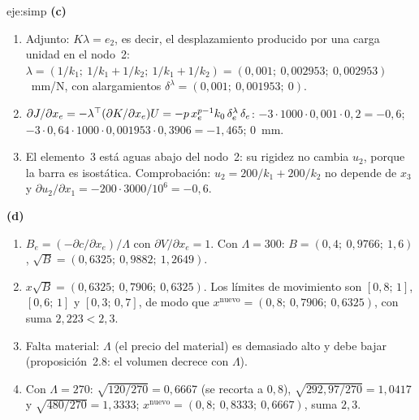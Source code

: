 \begin{solucion}{eje:simp}
\noindent\textbf{(c)}
\begin{enumerate}[label=\arabic*.]
  \item Adjunto: $K\lambda=e_2$, es decir, el desplazamiento producido por una carga unidad en el nodo~2: $\lambda=(1/k_1;\ 1/k_1+1/k_2;\ 1/k_1+1/k_2)=(0{,}001;\ 0{,}002953;\ 0{,}002953)$~mm/N, con alargamientos $\delta^{\lambda}=(0{,}001;\ 0{,}001953;\ 0)$.
  \item $\partial J/\partial x_e=-\lambda^{\top}(\partial K/\partial x_e)U=-p\,x_e^{p-1}k_0\,\delta^{\lambda}_e\,\delta_e$: $-3\cdot 1000\cdot 0{,}001\cdot 0{,}2=-0{,}6$; $-3\cdot 0{,}64\cdot 1000\cdot 0{,}001953\cdot 0{,}3906=-1{,}465$; $0$~mm.
  \item El elemento~3 está aguas abajo del nodo~2: su rigidez no cambia $u_2$, porque la barra es isostática. Comprobación: $u_2=200/k_1+200/k_2$ no depende de $x_3$ y $\partial u_2/\partial x_1=-200\cdot 3000/10^{6}=-0{,}6$.
\end{enumerate}

\noindent\textbf{(d)}
\begin{enumerate}[label=\arabic*.]
  \item $B_e=(-\partial c/\partial x_e)/\Lambda$ con $\partial V/\partial x_e=1$. Con $\Lambda=300$: $B=(0{,}4;\ 0{,}9766;\ 1{,}6)$, $\sqrt B=(0{,}6325;\ 0{,}9882;\ 1{,}2649)$.
  \item $x\sqrt B=(0{,}6325;\ 0{,}7906;\ 0{,}6325)$. Los límites de movimiento son $[0{,}8;\,1]$, $[0{,}6;\,1]$ y $[0{,}3;\,0{,}7]$, de modo que $x^{\text{nuevo}}=(0{,}8;\ 0{,}7906;\ 0{,}6325)$, con suma $2{,}223<2{,}3$.
  \item Falta material: $\Lambda$ (el precio del material) es demasiado alto y debe bajar (proposición~2.8: el volumen decrece con $\Lambda$).
  \item Con $\Lambda=270$: $\sqrt{120/270}=0{,}6667$ (se recorta a $0{,}8$), $\sqrt{292{,}97/270}=1{,}0417$ y $\sqrt{480/270}=1{,}3333$; $x^{\text{nuevo}}=(0{,}8;\ 0{,}8333;\ 0{,}6667)$, suma $2{,}3$.
\end{enumerate}


\end{solucion}
